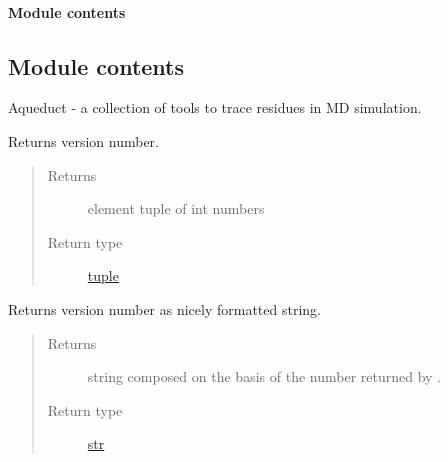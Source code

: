 \documentclass[a4paper,10pt,english]{sphinxmanual}
\begin{document}
\paragraph{Module contents}
\label{aqueduct.visual:module-aqueduct.visual}\label{aqueduct.visual:module-contents}

\subsection{Module contents}
\label{aqueduct:module-aqueduct}\label{aqueduct:module-contents}
Aqueduct - a collection of tools to trace residues in MD simulation.

\begin{fulllineitems}
\label{aqueduct:aqueduct.version}
Returns {\hyperref[aqueduct:module\string-aqueduct]{}} version number.
\begin{quote}\begin{description}
\item[{Returns}]  element tuple of int numbers

\item[{Return type}] \leavevmode
\href{http://docs.python.org/2/library/functions.html\#tuple}{tuple}

\end{description}\end{quote}

\end{fulllineitems}


\begin{fulllineitems}
\label{aqueduct:aqueduct.version_nice}
Returns {\hyperref[aqueduct:module\string-aqueduct]{}} version number as nicely formatted string.
\begin{quote}\begin{description}
\item[{Returns}] \leavevmode
string composed on the basis of the number returned by {\hyperref[aqueduct:aqueduct.version]{}}.

\item[{Return type}] \leavevmode
\href{http://docs.python.org/2/library/functions.html\#str}{str}

\end{description}\end{quote}

\end{fulllineitems}
\end{document}
